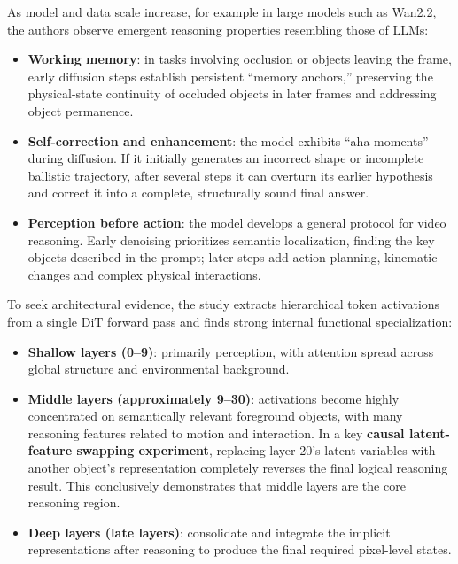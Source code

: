 As model and data scale increase, for example in large models such as Wan2.2, the authors observe emergent reasoning properties resembling those of LLMs:

\begin{itemize}
\tightlist
\item
  \textbf{Working memory}: in tasks involving occlusion or objects leaving the frame, early diffusion steps establish persistent ``memory anchors,'' preserving the physical-state continuity of occluded objects in later frames and addressing object permanence.
\item
  \textbf{Self-correction and enhancement}: the model exhibits ``aha moments'' during diffusion. If it initially generates an incorrect shape or incomplete ballistic trajectory, after several steps it can overturn its earlier hypothesis and correct it into a complete, structurally sound final answer.
\item
  \textbf{Perception before action}: the model develops a general protocol for video reasoning. Early denoising prioritizes semantic localization, finding the key objects described in the prompt; later steps add action planning, kinematic changes and complex physical interactions.
\end{itemize}

To seek architectural evidence, the study extracts hierarchical token activations from a single DiT forward pass and finds strong internal functional specialization:

\begin{itemize}
\tightlist
\item
  \textbf{Shallow layers (0--9)}: primarily perception, with attention spread across global structure and environmental background.
\item
  \textbf{Middle layers (approximately 9--30)}: activations become highly concentrated on semantically relevant foreground objects, with many reasoning features related to motion and interaction. In a key \textbf{causal latent-feature swapping experiment}, replacing layer 20's latent variables with another object's representation completely reverses the final logical reasoning result. This conclusively demonstrates that middle layers are the core reasoning region.
\item
  \textbf{Deep layers (late layers)}: consolidate and integrate the implicit representations after reasoning to produce the final required pixel-level states.
\end{itemize}

